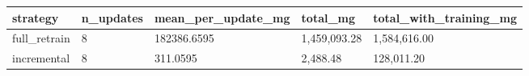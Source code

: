 \begin{tabular}{lllll}
\toprule
strategy & n_updates & mean_per_update_mg & total_mg & total_with_training_mg \\
\midrule
full_retrain & 8 & 182386.6595 & 1,459,093.28 & 1,584,616.00 \\
incremental & 8 & 311.0595 & 2,488.48 & 128,011.20 \\
\bottomrule
\end{tabular}
